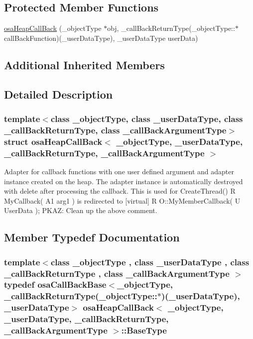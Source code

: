 \subsection*{Protected Member Functions}
\begin{DoxyCompactItemize}
\item 
\hyperlink{structosa_heap_call_back_a2e29b0f78f1c0c8248d18dfdbfa02418}{osa\+Heap\+Call\+Back} (\+\_\+object\+Type $\ast$obj, \+\_\+call\+Back\+Return\+Type(\+\_\+object\+Type\+::$\ast$call\+Back\+Function)(\+\_\+user\+Data\+Type), \+\_\+user\+Data\+Type user\+Data)
\end{DoxyCompactItemize}
\subsection*{Additional Inherited Members}


\subsection{Detailed Description}
\subsubsection*{template$<$class \+\_\+object\+Type, class \+\_\+user\+Data\+Type, class \+\_\+call\+Back\+Return\+Type, class \+\_\+call\+Back\+Argument\+Type$>$struct osa\+Heap\+Call\+Back$<$ \+\_\+object\+Type, \+\_\+user\+Data\+Type, \+\_\+call\+Back\+Return\+Type, \+\_\+call\+Back\+Argument\+Type $>$}

Adapter for callback functions with one user defined argument and adapter instance created on the heap. The adapter instance is automatically destroyed with delete after processing the callback. This is used for Create\+Thread() R My\+Callback( A1 arg1 ) is redirected to \mbox{[}virtual\mbox{]} R O\+::\+My\+Member\+Callback( U User\+Data ); P\+K\+A\+Z\+: Clean up the above comment. 

\subsection{Member Typedef Documentation}
\hypertarget{structosa_heap_call_back_a5ae1d7cd50191ab6f2026bf10b0fc3b5}{}
\subsubsection[{Base\+Type}]{\setlength{\rightskip}{0pt plus 5cm}template$<$class \+\_\+object\+Type , class \+\_\+user\+Data\+Type , class \+\_\+call\+Back\+Return\+Type , class \+\_\+call\+Back\+Argument\+Type $>$ typedef {\bf osa\+Call\+Back\+Base}$<$\+\_\+object\+Type, \+\_\+call\+Back\+Return\+Type(\+\_\+object\+Type\+::$\ast$)(\+\_\+user\+Data\+Type), \+\_\+user\+Data\+Type$>$ {\bf osa\+Heap\+Call\+Back}$<$ \+\_\+object\+Type, \+\_\+user\+Data\+Type, \+\_\+call\+Back\+Return\+Type, \+\_\+call\+Back\+Argument\+Type $>$\+::{\bf Base\+Type}}\label{structosa_heap_call_back_a5ae1d7cd50191ab6f2026bf10b0fc3b5}


